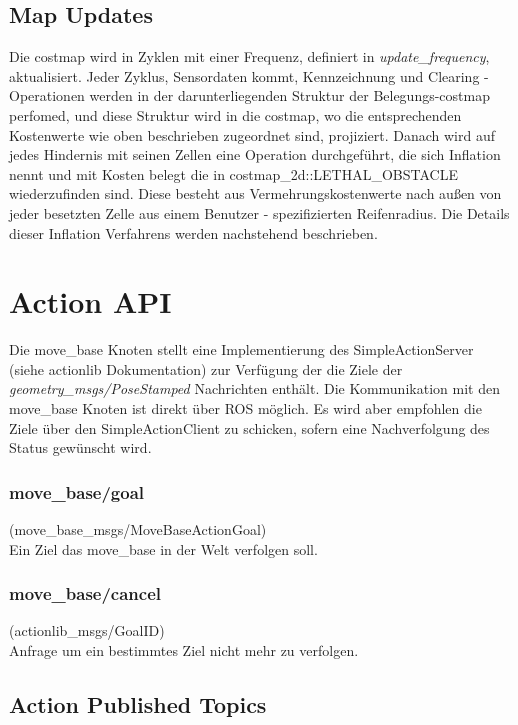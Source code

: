 \documentclass[oribibl]{llncs}
\begin{document}
\subsection{Map Updates}
Die costmap wird in Zyklen mit einer Frequenz, definiert in \textit{update\_frequency}, aktualisiert. Jeder Zyklus, Sensordaten kommt, Kennzeichnung und Clearing -Operationen werden in der darunterliegenden Struktur der Belegungs-costmap perfomed, und diese Struktur wird in die costmap, wo die entsprechenden Kostenwerte wie oben beschrieben zugeordnet sind, projiziert. Danach wird auf jedes Hindernis mit seinen Zellen eine Operation durchgeführt, die sich Inflation nennt und mit Kosten belegt die in costmap\_2d::LETHAL\_OBSTACLE wiederzufinden sind. Diese besteht aus Vermehrungskostenwerte nach außen von jeder besetzten Zelle aus einem Benutzer - spezifizierten Reifenradius. Die Details dieser Inflation Verfahrens werden nachstehend beschrieben.

\section{Action API}
Die move\_base Knoten stellt eine Implementierung des SimpleActionServer (siehe actionlib Dokumentation) zur Verfügung der die Ziele der \textit{geometry\_msgs/PoseStamped} Nachrichten enthält. Die Kommunikation mit den move\_base Knoten ist direkt über ROS möglich. Es wird aber empfohlen die Ziele über den SimpleActionClient zu schicken, sofern eine Nachverfolgung des Status gewünscht wird.
\subsubsection{move\_base/goal} (move\_base\_msgs/MoveBaseActionGoal)\\
	Ein Ziel das move\_base in der Welt verfolgen soll.
\subsubsection{move\_base/cancel} (actionlib\_msgs/GoalID)\\
	Anfrage um ein bestimmtes Ziel nicht mehr zu verfolgen.
\subsection{Action Published Topics}
\end{document}
